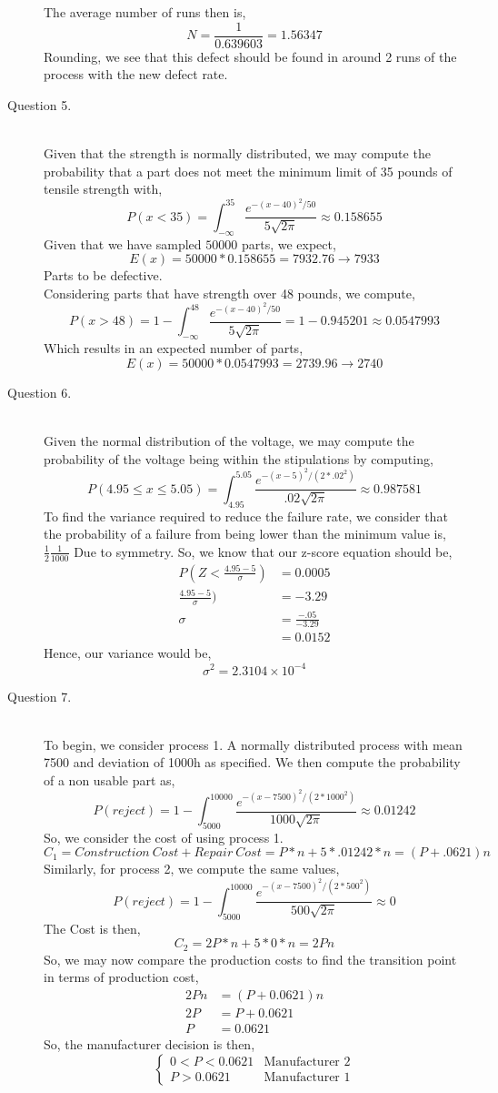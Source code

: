 \documentclass[letterpaper,10pt]{article}
\begin{document}
\begin{description}
The average number of runs then is,
\[N=\frac{1}{0.639603}=1.56347\]
Rounding, we see that this defect should be found in around 2 runs of the process with the new defect rate.
\item[Question 5.]\hfill \\
Given that the strength is normally distributed, we may compute the probability that a part does not meet the minimum limit of 35 pounds of tensile strength with,
\[P(x<35)=\int_{-\infty}^{35}\frac{e^{-(x-40)^2/50}}{5\sqrt{2\pi}}\approx 0.158655\]
Given that we have sampled $50000$ parts, we expect,
\[E(x)=50000*0.158655=7932.76\to 7933\]
Parts to be defective.\\
Considering parts that have strength over 48 pounds, we compute,
\[P(x>48)=1-\int_{-\infty}^{48}\frac{e^{-(x-40)^2/50}}{5\sqrt{2\pi}}=1-0.945201\approx 0.0547993\]
Which results in an expected number of parts,
\[E(x)=50000*0.0547993=2739.96\to 2740\]
\item[Question 6.]\hfill \\
Given the normal distribution of the voltage, we may compute the probability of the voltage being within the stipulations by computing,
\[P(4.95\leq x \leq 5.05)=\int_{4.95}^{5.05}\frac{e^{-(x-5)^2/(2*.02^2)}}{.02\sqrt{2\pi}}\approx 0.987581\]
To find the variance required to reduce the failure rate, we consider that the probability of a failure from being lower than the minimum value is, $\frac{1}{2}\frac{1}{1000}$ Due to symmetry. So, we know that our z-score equation should be,
\begin{align*}
P(Z<\frac{4.95-5}{\sigma})&=0.0005\\
\frac{4.95-5}{\sigma}) &= -3.29\\
\sigma &= \frac{-.05}{-3.29}\\
&= 0.0152
\end{align*}
Hence, our variance would be,
\[\sigma^2= 2.3104\times 10^{-4}\]
\item[Question 7.]\hfill \\
To begin, we consider process 1. A normally distributed process with mean 7500 and deviation of 1000h as specified. We then compute the probability of a non usable part as,
\[P(reject)=1-\int_{5000}^{10000}\frac{e^{-(x-7500)^2/(2*1000^2)}}{1000\sqrt{2\pi}}\approx 0.01242\]
So, we consider the cost of using process 1.
\[C_1=Construction\ Cost+Repair\ Cost=P*n+5*.01242*n=(P+.0621)n\]
Similarly, for process 2, we compute the same values,
\[P(reject)=1-\int_{5000}^{10000}\frac{e^{-(x-7500)^2/(2*500^2)}}{500\sqrt{2\pi}}\approx 0\]
The Cost is then,
\[C_2=2P*n+5*0*n=2Pn\]
So, we may now compare the production costs to find the transition point in terms of production cost,
\begin{align*}
2Pn&=(P+0.0621)n\\
2P &= P+0.0621\\
P&=0.0621
\end{align*}
So, the manufacturer decision is then,
\[\begin{cases}
0<P<0.0621 & \text{Manufacturer 2}\\
P>0.0621 & \text{Manufacturer 1}
\end{cases}\]
\end{description}
\end{document}
